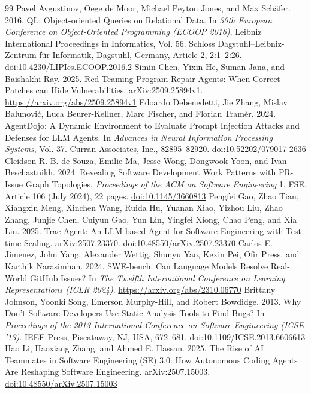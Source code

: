 \documentclass[acmsmall,screen,nonacm]{acmart}
\providecommand{\doi}[1]{\href{https://doi.org/#1}{doi:#1}}
\begin{document}
\clearpage
\raggedbottom
\begingroup
\begin{thebibliography}{99}
\fontsize{8}{8.5}\selectfont
\enlargethispage{\baselineskip}
\setlength{\itemsep}{0pt}
\setlength{\parsep}{0pt}
\setlength{\parskip}{0pt}
 Pavel Avgustinov, Oege de Moor, Michael Peyton Jones, and Max Sch\"afer. 2016. QL: Object-oriented Queries on Relational Data. In \emph{30th European Conference on Object-Oriented Programming (ECOOP 2016)}, Leibniz International Proceedings in Informatics, Vol. 56. Schloss Dagstuhl--Leibniz-Zentrum f\"ur Informatik, Dagstuhl, Germany, Article 2, 2:1--2:26. \doi{10.4230/LIPIcs.ECOOP.2016.2}
 Simin Chen, Yixin He, Suman Jana, and Baishakhi Ray. 2025. Red Teaming Program Repair Agents: When Correct Patches can Hide Vulnerabilities. arXiv:2509.25894v1. \url{https://arxiv.org/abs/2509.25894v1}
 Edoardo Debenedetti, Jie Zhang, Mislav Balunovi\'c, Luca Beurer-Kellner, Marc Fischer, and Florian Tram\`er. 2024. AgentDojo: A Dynamic Environment to Evaluate Prompt Injection Attacks and Defenses for LLM Agents. In \emph{Advances in Neural Information Processing Systems}, Vol. 37. Curran Associates, Inc., 82895--82920. \doi{10.52202/079017-2636}
 Cleidson R. B. de Souza, Emilie Ma, Jesse Wong, Dongwook Yoon, and Ivan Beschastnikh. 2024. Revealing Software Development Work Patterns with PR-Issue Graph Topologies. \emph{Proceedings of the ACM on Software Engineering} 1, FSE, Article 106 (July 2024), 22 pages. \doi{10.1145/3660813}
 Pengfei Gao, Zhao Tian, Xiangxin Meng, Xinchen Wang, Ruida Hu, Yuanan Xiao, Yizhou Liu, Zhao Zhang, Junjie Chen, Cuiyun Gao, Yun Lin, Yingfei Xiong, Chao Peng, and Xia Liu. 2025. Trae Agent: An LLM-based Agent for Software Engineering with Test-time Scaling. arXiv:2507.23370. \doi{10.48550/arXiv.2507.23370}
 Carlos E. Jimenez, John Yang, Alexander Wettig, Shunyu Yao, Kexin Pei, Ofir Press, and Karthik Narasimhan. 2024. SWE-bench: Can Language Models Resolve Real-World GitHub Issues? In \emph{The Twelfth International Conference on Learning Representations (ICLR 2024)}. \url{https://arxiv.org/abs/2310.06770}
 Brittany Johnson, Yoonki Song, Emerson Murphy-Hill, and Robert Bowdidge. 2013. Why Don't Software Developers Use Static Analysis Tools to Find Bugs? In \emph{Proceedings of the 2013 International Conference on Software Engineering (ICSE '13)}. IEEE Press, Piscataway, NJ, USA, 672--681. \doi{10.1109/ICSE.2013.6606613}
 Hao Li, Haoxiang Zhang, and Ahmed E. Hassan. 2025. The Rise of AI Teammates in Software Engineering (SE) 3.0: How Autonomous Coding Agents Are Reshaping Software Engineering. arXiv:2507.15003. \doi{10.48550/arXiv.2507.15003}

\end{thebibliography}
\end{document}
